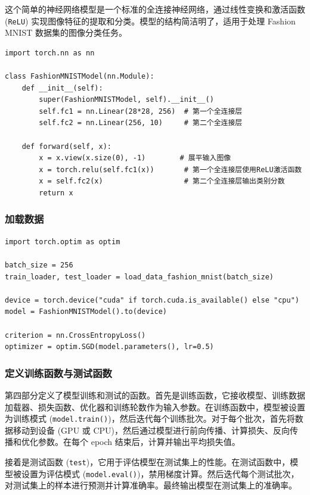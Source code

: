 \documentclass[a4paper,12pt]{article}
\begin{document}
这个简单的神经网络模型是一个标准的全连接神经网络，通过线性变换和激活函数 (\texttt{ReLU}) 实现图像特征的提取和分类。模型的结构简洁明了，适用于处理 Fashion MNIST 数据集的图像分类任务。

\begin{lstlisting}
import torch.nn as nn

class FashionMNISTModel(nn.Module):
    def __init__(self):
        super(FashionMNISTModel, self).__init__()
        self.fc1 = nn.Linear(28*28, 256)  # 第一个全连接层
        self.fc2 = nn.Linear(256, 10)     # 第二个全连接层

    def forward(self, x):
        x = x.view(x.size(0), -1)        # 展平输入图像
        x = torch.relu(self.fc1(x))       # 第一个全连接层使用ReLU激活函数
        x = self.fc2(x)                   # 第二个全连接层输出类别分数
        return x

\end{lstlisting}

\subsubsection{加载数据}
\begin{lstlisting}
import torch.optim as optim

batch_size = 256
train_loader, test_loader = load_data_fashion_mnist(batch_size)

device = torch.device("cuda" if torch.cuda.is_available() else "cpu")
model = FashionMNISTModel().to(device)

criterion = nn.CrossEntropyLoss()
optimizer = optim.SGD(model.parameters(), lr=0.5)
\end{lstlisting}

\subsubsection{定义训练函数与测试函数}
第四部分定义了模型训练和测试的函数。首先是训练函数，它接收模型、训练数据加载器、损失函数、优化器和训练轮数作为输入参数。在训练函数中，模型被设置为训练模式 (\texttt{model.train()})，然后迭代每个训练批次。对于每个批次，首先将数据移动到设备 (GPU 或 CPU)，然后通过模型进行前向传播、计算损失、反向传播和优化参数。在每个 epoch 结束后，计算并输出平均损失值。

接着是测试函数 (\texttt{test})，它用于评估模型在测试集上的性能。在测试函数中，模型被设置为评估模式 (\texttt{model.eval()})，禁用梯度计算。然后迭代每个测试批次，对测试集上的样本进行预测并计算准确率。最终输出模型在测试集上的准确率。
\end{document}
